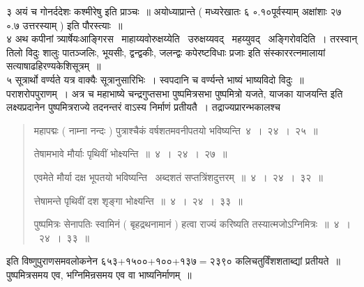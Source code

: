 \documentclass[11pt, openany]{book}
\begin{document}
३ अयं च गोनर्ददेशः कश्मीरेषु इति प्राञ्चः~॥ अयोध्याप्रान्ते ( मध्यरेखातः ६ ∘.१०{\qt पूर्वस्याम् अक्षांशाः २७ ∘.७} उत्तरस्याम् ) इति पौरस्त्याः~॥\\

४ अथ कपीनां त्र्यार्षेयःआङ्गिरस \textendash\ माहाय्यवोरुक्षय्येति \textendash\ उरुक्षय्यवद् \textendash\ महय्युवद् \textendash\ अङ्गिरोवदिति~। तरस्वान् तिलो विदुः शालुः पातञ्जलिः, भूयसीः, द्वन्द्वकीः, जलन्द्वः कपेरष्टविधाः प्रजाः इति संस्काररत्नमालायां सत्याषाढहिरण्यकेशिसूत्रम्~॥\\

५ {\qt सूत्रार्थो वर्ण्यते यत्र वाक्यैः सूत्रानुसारिभिः~। स्वपदानि च वर्ण्यन्ते भाष्यं भाष्यविदो विदुः~॥\\
पराशरोपपुराणम्~। अत्र च महाभाष्ये }चन्द्रगुप्तसभा पुष्पमित्रसभा पुष्पमित्रो यजते, याजका याजयन्ति इति लक्ष्यप्रदानेन पुष्पमित्रराज्ये तदनन्तरं वाऽस्य निर्माणं प्रतीयतै~। तद्राज्यप्रारन्भकालश्च \textendash\ 

\begin{quote}
{\qt महापद्मः ( नाम्ना नन्दः ) पुत्राश्चैकं वर्षशतमवनीपतयो भविष्यन्ति~४~।~२४~।~२५~॥

तेषामभावे मौर्याः पृथिवीं भोक्ष्यन्ति~॥~४~।~२४~।~२७~॥

एवमेते मौर्या दक्ष भूपतयो भविष्यन्ति \textendash\ अब्दशतं सप्तत्रिंशदुत्तरम्~॥~४~।~२४~।~३२~॥

त्तेषामन्ते पृथिवीं दश शृङ्गा भोक्ष्यन्ति~॥~४~।~२४~।~३३~॥

पुष्पमित्रः सेनापतिः स्वामिनं ( बृहद्रथनामानं ) हत्वा राज्यं करिष्यति तस्यात्मजोऽग्निमित्रः~॥~४~।~२४~।~३३~॥}
\end{quote}

इति विष्णुपुराणसमवलोकनेन ६५३+१५००+१००+१३७$=$२३९० कलिचतुर्विंशशताब्द्यां प्रतीयते~॥ पुष्पमित्रसमय एव, भग्निमिन्रसमय एव वा भाष्यनिर्माणम्~॥
\end{document}
